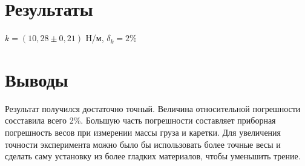 \documentclass[12pt]{article}
\begin{document}
\section{Результаты}
$k=(10{,}28\pm0{,}21)$ Н/м, $\delta_k=2\%$\\
\section{Выводы}
Результат получился достаточно точный. Величина относительной погрешности сосставила всего 2\%. Большую часть погрешности составляет приборная погрешность весов при измерении массы груза и каретки. Для увеличения точности эксперимента можно было бы использовать более точные весы и сделать саму установку из более гладких материалов, чтобы уменьшить трение.
\end{document}
